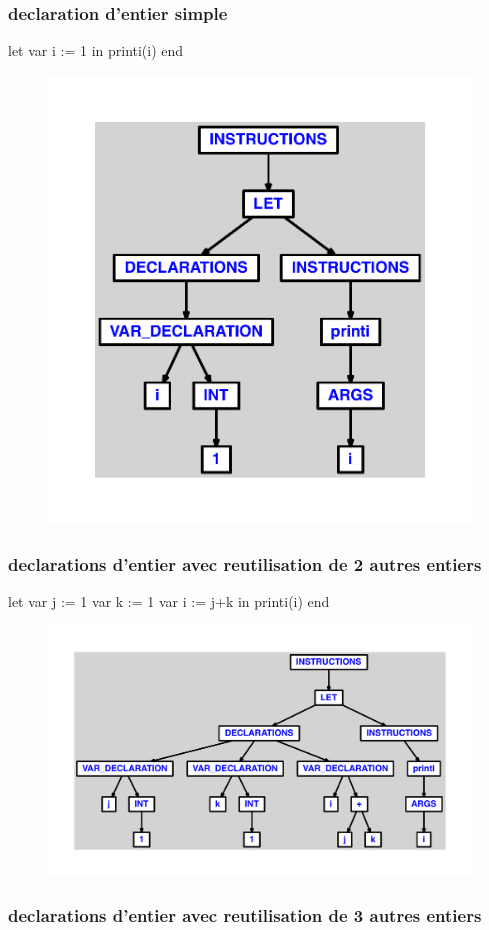 \documentclass{article}
\begin{document}
\subsubsection{declaration d'entier simple}
\begin{verbatimtab}let
	var i := 1
in
	printi(i)
end
\end{verbatimtab}
\begin{figure}[H]\centering\includegraphics[max width=\textwidth]{ast/ast_294.pdf}\end{figure}\subsubsection{declarations d'entier avec reutilisation de 2 autres entiers}
\begin{verbatimtab}
let
	var j := 1
	var k := 1
	var i := j+k
in
	printi(i)
end
\end{verbatimtab}
\begin{figure}[H]\centering\includegraphics[max width=\textwidth]{ast/ast_295.pdf}\end{figure}\subsubsection{declarations d'entier avec reutilisation de 3 autres entiers}
\end{document}

